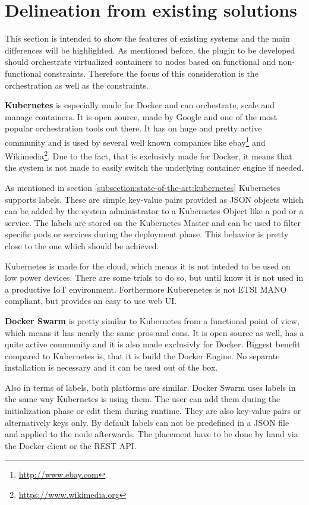\section{Delineation from existing solutions}
This section is intended to show the features of existing systems and the main differences will be highlighted.
As mentioned before, the plugin to be developed should orchestrate virtualized containers to nodes based on functional and non-functional constraints.
Therefore the focus of this consideration is the orchestration as well as the constraints.

\textbf{Kubernetes} is especially made for Docker and can orchestrate, scale and manage containers.
It is open source, made by Google and one of the most popular orchestration tools out there.
It has on huge and pretty active community and is used by several well known companies\autocite{Kubernetes:Case-Studies} like ebay\footnote{\url{http://www.ebay.com}} and Wikimedia\footnote{\url{https://www.wikimedia.org}}.
Due to the fact, that is exclusivly made for Docker, it means that the system is not made to easily switch the underlying container engine if needed.

As mentioned in section \ref{subsection:state-of-the-art:kubernetes} Kubernetes supports labels.
These are simple key-value pairs provided as \ac{JSON} objects which can be added by the system administrator to a Kubernetes Object like a pod or a service.
The labels are stored on the Kubernetes Master and can be used to filter specific pods or services during the deployment phase.
This behavior is pretty close to the one which should be achieved.

Kubernetes is made for the cloud, which means it is not inteded to be used on low power devices.
There are some trials to do so, but until know it is not used in a productive \ac{IoT} environment.
Forthermore Kuberenetes is not \ac{ETSI} \ac{MANO} compliant, but provides an easy to use web \ac{UI}.

\textbf{Docker Swarm} is pretty similar to Kubernetes from a functional point of view, which means it has nearly the same pros and cons.
It is open source as well, has a quite active community and it is also made exclusivly for Docker.
Biggest benefit compared to Kubernetes is, that it is build the Docker Engine.
No separate installation is necessary and it can be used out of the box.

Also in terms of labels, both platforms are similar.
Docker Swarm uses labels in the same way Kubernetes is using them.
The user can add them during the initialization phase or edit them during runtime.
They are also key-value pairs or alternatively keys only.
By default labels can not be predefined in a \ac{JSON} file and applied to the node afterwards.
The placement have to be done by hand via the Docker client or the \ac{REST} \ac{API}.

